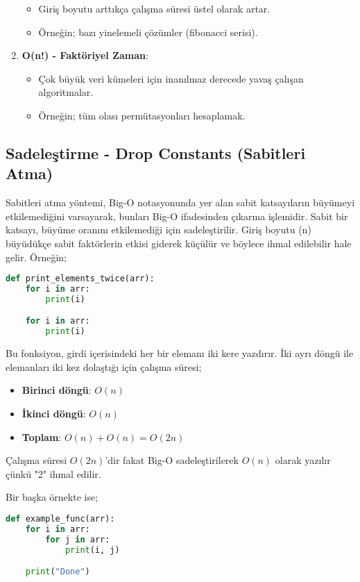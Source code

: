 \begin{enumerate}
\begin{itemize}
        \item Giriş boyutu arttıkça çalışma süresi üstel olarak artar.
        \item Örneğin; bazı yinelemeli çözümler (fibonacci serisi).
    \end{itemize}
    \item \textbf{O(n!) - Faktöriyel Zaman}:
    \begin{itemize}
        \item Çok büyük veri kümeleri için inanılmaz derecede yavaş çalışan algoritmalar.
        \item Örneğin; tüm olası permütasyonları hesaplamak.
    \end{itemize}
\end{enumerate}

\subsection{Sadeleştirme - Drop Constants (Sabitleri Atma)}

Sabitleri atma yöntemi, Big-O notasyonunda yer alan sabit katsayıların büyümeyi etkilemediğini varsayarak, bunları Big-O ifadesinden çıkarma işlemidir. Sabit bir katsayı, büyüme oranını etkilemediği için sadeleştirilir. Giriş boyutu (n) büyüdükçe sabit faktörlerin etkisi giderek küçülür ve böylece ihmal edilebilir hale gelir. Örneğin;

\begin{lstlisting}[language=Python]
def print_elements_twice(arr):
    for i in arr:
        print(i)

    for i in arr:
        print(i)
\end{lstlisting}

Bu fonksiyon, girdi içerisindeki her bir elemanı iki kere yazdırır. İki ayrı döngü ile elemanları iki kez dolaştığı için çalışma süresi;

\begin{itemize}
    \item \textbf{Birinci döngü}: $O(n)$
    \item \textbf{İkinci döngü}: $O(n)$
    \item \textbf{Toplam}: $O(n) + O(n) = O(2n)$
\end{itemize}

Çalışma süresi $O(2n)$'dir fakat Big-O sadeleştirilerek $O(n)$ olarak yazılır çünkü "2" ihmal edilir.

Bir başka örnekte ise;

\begin{lstlisting}[language=Python]
def example_func(arr):
    for i in arr:
        for j in arr:
            print(i, j)

    print("Done")
\end{lstlisting}


